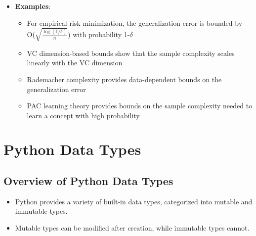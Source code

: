 \documentclass{article}
\begin{document}
\begin{itemize}
    \item \textbf{Examples}:
    \begin{itemize}
        \item For empirical risk minimization, the generalization error is bounded by O($\sqrt{\frac{\log(1/\delta)}{n}}$) with probability 1-$\delta$
        \item VC dimension-based bounds show that the sample complexity scales linearly with the VC dimension
        \item Rademacher complexity provides data-dependent bounds on the generalization error
        \item PAC learning theory provides bounds on the sample complexity needed to learn a concept with high probability
    \end{itemize}
\end{itemize}

\section{Python Data Types}

\subsection{Overview of Python Data Types}
\begin{itemize}
    \item Python provides a variety of built-in data types, categorized into mutable and immutable types.
    \item Mutable types can be modified after creation, while immutable types cannot.
\end{itemize}
\end{document}
